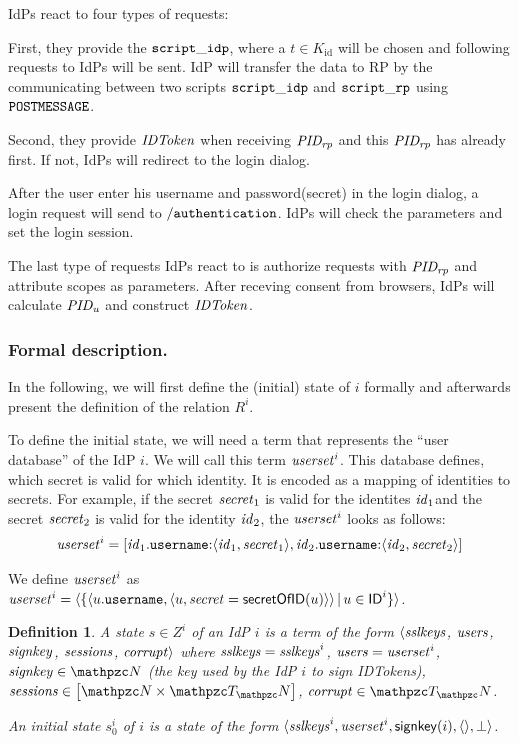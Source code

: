 \documentclass[letterpaper,onecolumn,10pt]{article}
\newtheorem{definition}{Definition}
\begin{document}
IdPs react to four types of requests:

First, they provide the $\mathtt{script\_idp}$, where a $t\in K_\text{id}$ will 
be chosen and following requests to IdPs will be sent. IdP will transfer the data
to RP by the communicating between two scripts $\mathtt{script\_idp}$ and $\mathtt{script\_rp}$
using $\mathtt{POSTMESSAGE}$.

Second, they provide $\mathit{IDToken}$ when receiving $\mathit{PID_{rp}}$ and this 
$\mathit{PID_{rp}}$ has already first. If not, IdPs will redirect to the login dialog.

After the user enter his username and password(secret) in the login dialog, a login
request will send to $\mathtt{/authentication}$. IdPs will check the parameters and 
set the login session.

The last type of requests IdPs react to is authorize requests with $\mathit{PID_{rp}}$ and attribute
scopes as parameters. After receving consent from browsers, IdPs will calculate 
$\mathit{PID_{u}}$ and construct $\mathit{IDToken}$.

\subsubsection{Formal description.} In the following, we will first
define the (initial) state of $i$ formally and afterwards present the
definition of the relation $R^i$.

To define the initial state, we will need a term that represents the
``user database'' of the IdP $i$. We will call this term
$\mathit{userset}^i$. This database defines, which secret is valid for
which identity. It is encoded as a mapping of identities to secrets.
For example, if the secret $\mathit{secret}_1$ is valid for the identites
$\mathit{id}_1$and the secret $\mathit{secret}_2$ is valid for the identity
$\mathit{id}_2$, the $\mathit{userset}^i$ looks as follows:
\begin{align*}
\mathit{userset}^i = [\mathit{id}_1.\mathtt{username}{:}\langle {{}\mathit{id}_1, \mathit{secret}_1} \rangle, 
  \mathit{id}_2.\mathtt{username}{:}\langle {{}\mathit{id}_2, \mathit{secret}_2} \rangle]
\end{align*}

We define $\mathit{userset}^i$ as $\mathit{userset}^i = \langle\{\langle u.\mathtt{username},
    \langle {{}u, \mathit{secret} = \mathsf{secretOfID}(u)} \rangle\rangle\, |\, u \in \mathsf{ID}^i\}\rangle$.

\begin{definition}\label{def:initial-state-idp}
  A \emph{state $s\in Z^i$ of an IdP $i$} is a term of the form
  $\langle\mathit{sslkeys}$, $\mathit{users}$, $\mathit{signkey}$,
  $\mathit{sessions}$, $\mathit{corrupt}\rangle$ where $\mathit{sslkeys} =
  \mathit{sslkeys}^i $, $\mathit{users} = \mathit{userset}^i$, $\mi{signkey} \in
  \nonces$ (the key used by the IdP $i$ to sign IDTokens),
  $\mi{sessions}\in\dict{\nonces}{\terms}$, $\mi{corrupt} \in \terms$.

  An \emph{initial state $s^i_0$ of $i$} is a state of the form $\langle
    \mathit{sslkeys}^i, \mathit{userset}^i, \mathsf{signkey}(i), \langle\rangle,
    \bot\rangle$.
\end{definition}
\end{document}
